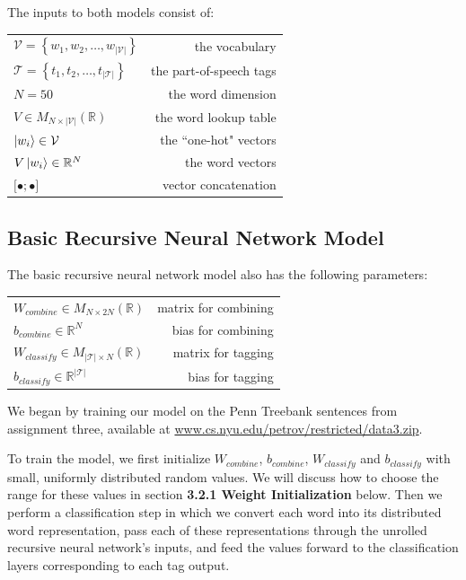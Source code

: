 \documentclass[11pt]{article}
\begin{document}
The inputs to both models consist of:

\begin{center}
\begin{tabular}{ l r }
  $\mathcal{V} = \left\{w_1,w_2,\ldots,w_{\left\vert\mathcal{V}\right\vert}\right\}$ & the vocabulary \\
  $\mathcal{T} = \left\{t_1,t_2,\ldots,t_{\left\vert\mathcal{T}\right\vert}\right\}$ & the part-of-speech tags \\
  $N = 50$ & the word dimension \\
  $V\in M_{N\times\left\vert\mathcal{V}\right\vert}(\mathbb{R})$ & the word lookup table \\
  $\Ket{w_i}\in\mathcal{V}$ & the ``one-hot" vectors \\
  $V\Ket{w_i}\in\mathbb{R}^N$ & the word vectors \\
  $\Big[\bullet;\bullet\Big]$ & vector concatenation \\
\end{tabular}
\end{center}
\vspace{5mm}

\subsection{Basic Recursive Neural Network Model}

The basic recursive neural network model also has the following parameters:

\begin{center}
\begin{tabular}{ l r }
  $W_{combine}\in M_{N\times2N}(\mathbb{R})$ & matrix for combining \\
  $b_{combine}\in \mathbb{R}^N$ & bias for combining \\
  $W_{classify}\in M_{\left\vert\mathcal{T}\right\vert\times N}(\mathbb{R})$ & matrix for tagging \\
  $b_{classify}\in \mathbb{R}^{\left\vert\mathcal{T}\right\vert}$ & bias for tagging \\
\end{tabular}
\end{center}

\vspace{5mm}
We began by training our model on the Penn Treebank sentences from assignment three, available at \hyperlink{http://www.cs.nyu.edu/petrov/restricted/data3.zip}{www.cs.nyu.edu/petrov/restricted/data3.zip}.

To train the model, we first initialize $W_{combine}$, $b_{combine}$, $W_{classify}$ and $b_{classify}$ with small, uniformly distributed random values. We will discuss how to choose the range for these values in section \textbf{3.2.1 Weight Initialization} below. Then we perform a classification step in which we convert each word into its distributed word representation, pass each of these representations through the unrolled recursive neural network's inputs, and feed the values forward to the classification layers corresponding to each tag output.
\end{document}
